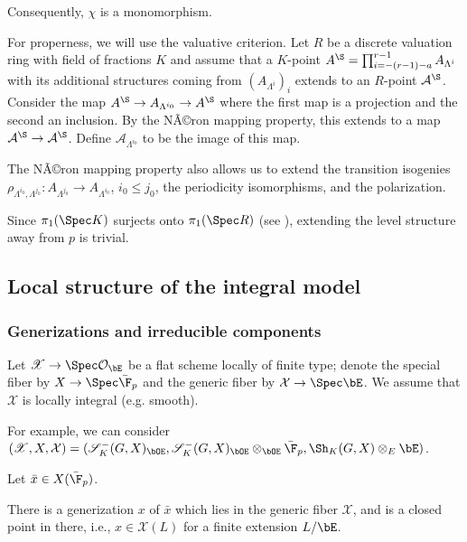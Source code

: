 \documentclass[a4paper]{scrartcl} %
\numberwithin{equation}{section}
\begin{document}
\begin{Proof}
  Consequently, $\chi$ is a monomorphism.

  For properness, we will use the valuative criterion. Let $R$ be a discrete valuation ring with field of fractions $K$ and assume that a $K$-point $A^\S=\prod_{i=-(r-1)-a}^{r-1} A_{\Lambda^i}$ with its additional structures coming from $(A_{\Lambda^i})_i$ extends to an $R$-point $\mathcal{A}^\S$. Consider the map $A^\S\to A_{\Lambda^{i_0}}\to A^\S$ where the first map is a projection and the second an inclusion. By the NÃ©ron mapping property, this extends to a map $\mathcal{A}^\S\to\mathcal{A}^\S$. Define $\mathcal{A}_{\Lambda^{i_0}}$ to be the image of this map.

  The NÃ©ron mapping property also allows us to extend the transition isogenies $\rho_{\Lambda^{i_0},\Lambda^{j_0}}\colon\allowbreak {A_{\Lambda^{j_0}}\to A_{\Lambda^{i_0}}}$, $i_0\leq j_0$,  the periodicity isomorphisms, and the polarization.

  Since $\pi_1(\Spec K)$ surjects onto $\pi_1(\Spec R)$ (see ), extending the level structure away from $p$ is trivial.
\end{Proof}



\subsection{Local structure of the integral model}
\label{sec:local-structure}

\subsubsection{Generizations and irreducible components}
\label{sec:gener-irred-comp}

Let $\mathscr{X}\to \Spec \mathcal{O}_{\bE}$ be a flat
scheme locally of finite type; denote the special fiber by $X\to \Spec\bar\F_p$ and the generic fiber by $\mathcal{X}\to\Spec\bE$. We assume that $\mathcal{X}$ is locally integral (e.g. smooth).

For example, we can consider $(\mathscr{X},X,\mathcal{X})=(\mathscr{S}^-_K(G,X)_{\bOE}, \mathscr{S}^-_K(G,X)_{\bOE}\otimes_{\bOE}\bar\F_p,\allowbreak {\Sh_K(G,X)\otimes_E\bE})$.

Let $\bar x\in X(\bar\F_p)$. 

\begin{Lemma}\label{closed-generizations}
  There is a generization $x$ of $\bar x$ which lies in the generic fiber $\mathcal{X}$, and is a closed point in there, i.e., $x\in \mathcal{X}(L)$ for a finite extension $L/\bE$.
\end{Lemma}
\end{document}
